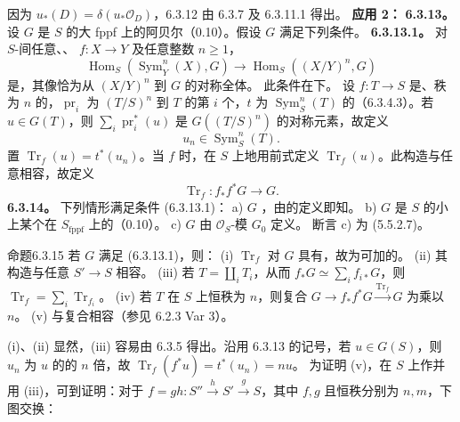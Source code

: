 因为 $u_*(D)=\delta(u_*\mathcal O_D)$，6.3.12 由 6.3.7 及 6.3.11.1 得出。
\textbf{应用 2：}
\textbf{6.3.13。} 设 $G$ 是 $S$ 的大 fppf 上的阿贝尔（0.10）。假设 $G$ 满足下列条件。
\textbf{6.3.13.1。} 对 $S$-间任意、、 $f:X\to Y$ 及任意整数 $n\ge1$，
\[\operatorname{Hom}_S(\operatorname{Sym}_Y^n(X),G)\longrightarrow\operatorname{Hom}_S((X/Y)^n,G)\]
是，其像恰为从 $(X/Y)^n$ 到 $G$ 的对称全体。
此条件在下。
设 $f:T\to S$ 是、秩为 $n$ 的，$\operatorname{pr}_i$ 为 $(T/S)^n$ 到 $T$ 的第 $i$ 个，$t$ 为 $\operatorname{Sym}_S^n(T)$ 的（6.3.4.3）。若 $u\in G(T)$，则 $\sum_i\operatorname{pr}_i^*(u)$ 是 $G((T/S)^n)$ 的对称元素，故定义
\[u_n\in\operatorname{Sym}_S^n(T).\]
置 $\operatorname{Tr}_f(u)=t^*(u_n)$。当 $f$ 时，在 $S$ 上地用前式定义 $\operatorname{Tr}_f(u)$。此构造与任意相容，故定义
\[\operatorname{Tr}_f:f_*f^*G\longrightarrow G.\tag{6.3.13.2}\]
\textbf{6.3.14。} 下列情形满足条件 (6.3.13.1)：
a) $G$ ，由的定义即知。
b) $G$ 是 $S$ 的小上某个在 $S_{\mathrm{fppf}}$ 上的（0.10）。
c) $G$ 由 $\mathcal O_S$-模 $G_0$ 定义。
断言 c) 为 (5.5.2.7)。
\begin{SGAresult}{命题}{6.3.15}
若 $G$ 满足 (6.3.13.1)，则：
(i)  $\operatorname{Tr}_f$ 对 $G$ 具有，故为可加的。
(ii) 其构造与任意 $S'\to S$ 相容。
(iii) 若 $T=\coprod_iT_i$，从而 $f_*G\simeq\sum_i f_{i*}G$，则 $\operatorname{Tr}_f=\sum_i\operatorname{Tr}_{f_i}$。
(iv) 若 $T$ 在 $S$ 上恒秩为 $n$，则复合 $G\to f_*f^*G\xrightarrow{\operatorname{Tr}_f}G$ 为乘以 $n$。
(v) 与复合相容（参见 6.2.3 Var 3）。
\end{SGAresult}
(i)、(ii) 显然，(iii) 容易由 6.3.5 得出。沿用 6.3.13 的记号，若 $u\in G(S)$，则 $u_n$ 为 $u$ 的的 $n$ 倍，故 $\operatorname{Tr}_f(f^*u)=t^*(u_n)=nu$。
为证明 (v)，在 $S$ 上作并用 (iii)，可到证明：对于 $f=gh:S''\xrightarrow{h}S'\xrightarrow{g}S$，其中 $f,g$ 且恒秩分别为 $n,m$，下图交换：
